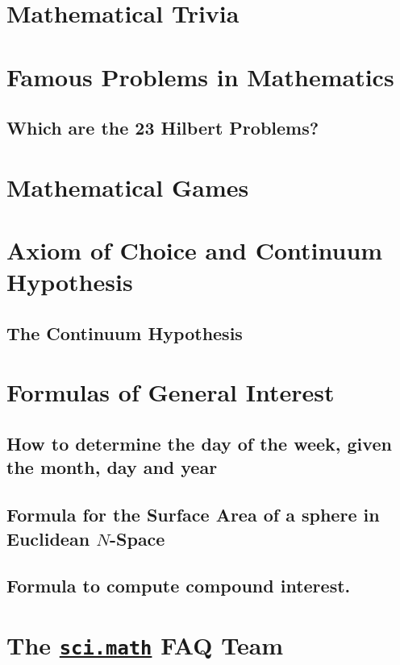 \documentclass[a4paper]{report}
\begin{document}
\chapter{Mathematical Trivia}
  
\chapter{Famous Problems in Mathematics}
  
  
  \section{Which are the 23 Hilbert Problems?}
    
  
\chapter{Mathematical Games}
  
\chapter{Axiom of Choice and Continuum Hypothesis}
  
  
  \section{The Continuum Hypothesis}
    
\chapter{Formulas of General Interest}
  \section{How to determine the day of the week, given the month,
             day and year}
    
   
  \section{Formula for the Surface Area of a sphere in Euclidean $N$-Space}
    
  \section{Formula to compute compound interest.}
    
%   
\chapter{The \href{news://sci.math}{\texttt{sci.math}} FAQ Team}
  

\nocite{*}


\end{document}
